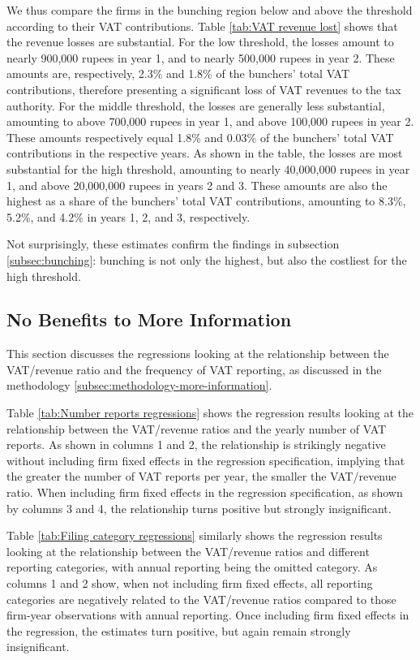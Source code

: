 We thus compare the firms in the bunching region below and above the
threshold according to their VAT contributions. Table \ref{tab:VAT revenue lost}
shows that the revenue losses are substantial. For the low threshold,
the losses amount to nearly 900,000 rupees in year 1, and to nearly
500,000 rupees in year 2. These amounts are, respectively, 2.3\% and
1.8\% of the bunchers' total VAT contributions, therefore presenting
a significant loss of VAT revenues to the tax authority. For the middle
threshold, the losses are generally less substantial, amounting to
above 700,000 rupees in year 1, and above 100,000 rupees in year 2.
These amounts respectively equal 1.8\% and 0.03\% of the bunchers'
total VAT contributions in the respective years. As shown in the table,
the losses are most substantial for the high threshold, amounting
to nearly 40,000,000 rupees in year 1, and above 20,000,000 rupees
in years 2 and 3. These amounts are also the highest as a share of
the bunchers' total VAT contributions, amounting to 8.3\%, 5.2\%,
and 4.2\% in years 1, 2, and 3, respectively.

Not surprisingly, these estimates confirm the findings in subsection
\ref{subsec:bunching}: bunching is not only the highest, but also the
costliest for the high threshold.

\subsection{No Benefits to More Information}
\label{subsec:3-results-more-information}
This section discusses the regressions looking at the relationship between the VAT/revenue ratio and the frequency of VAT reporting, as discussed in the methodology \cref{subsec:methodology-more-information}.

Table \ref{tab:Number reports regressions} shows the regression results
looking at the relationship between the VAT/revenue ratios and the
yearly number of VAT reports. As shown in columns 1 and 2, the relationship
is strikingly negative without including firm fixed effects in the
regression specification, implying that the greater the number of
VAT reports per year, the smaller the VAT/revenue ratio. When including
firm fixed effects in the regression specification, as shown by columns
3 and 4, the relationship turns positive but strongly insignificant.

Table \ref{tab:Filing category regressions} similarly shows the regression
results looking at the relationship between the VAT/revenue ratios
and different reporting categories, with annual reporting being the
omitted category. As columns 1 and 2 show, when not including firm
fixed effects, all reporting categories are negatively related to
the VAT/revenue ratios compared to those firm-year observations with
annual reporting. Once including firm fixed effects in the regression,
the estimates turn positive, but again remain strongly insignificant.

